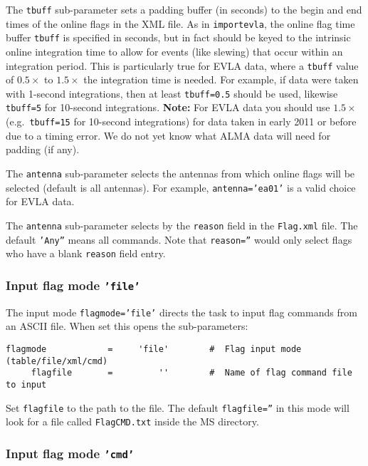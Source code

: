 The {\tt tbuff} sub-parameter sets a padding buffer (in seconds)
to the begin and end times of the online flags in the XML file.
As in {\tt importevla}, the online flag time buffer {\tt tbuff} is specified in
seconds, but in fact should be keyed to the intrinsic online 
integration time to allow for events (like slewing) that occur
within an integration period.  This is particularly true for EVLA data,
where a {\tt tbuff} value of $0.5\times$ to $1.5\times$ the
integration time is needed.  For example, if data were taken with
1-second integrations, then at least {\tt tbuff=0.5} should be used,
likewise {\tt tbuff=5} for 10-second integrations.
{\bf Note:} For EVLA data you should use $1.5\times$ (e.g.\ 
{\tt tbuff=15} for 10-second integrations) for data taken in 
early 2011 or before due to a timing error.  We do not yet know what
ALMA data will need for padding (if any).

The {\tt antenna} sub-parameter selects the antennas from which
online flags will be selected (default is all antennas).  For example,
{\tt antenna='ea01'} is a valid choice for EVLA data.

The {\tt antenna} sub-parameter selects by the {\tt reason} field in
the {\tt Flag.xml} file.  The default {\tt 'Any''} means all commands.
Note that {\tt reason=''} would only select flags who have a blank {\tt reason}
field entry.

\subsubsection{Input flag mode {\tt 'file'}}
\label{section:edit.flagcmd.flagmode.file}

The input mode {\tt flagmode='file'} directs the
task to input flag commands from an ASCII file.  
When set this opens the sub-parameters:
\small
\begin{verbatim}
flagmode            =     'file'        #  Flag input mode (table/file/xml/cmd)
     flagfile       =         ''        #  Name of flag command file to input
\end{verbatim}
\normalsize
Set {\tt flagfile} to the path to the file.  The default 
{\tt flagfile=''} in this mode will look for a file called 
{\tt FlagCMD.txt} inside the MS directory.

\subsubsection{Input flag mode {\tt 'cmd'}}
\label{section:edit.flagcmd.flagmode.cmd}

